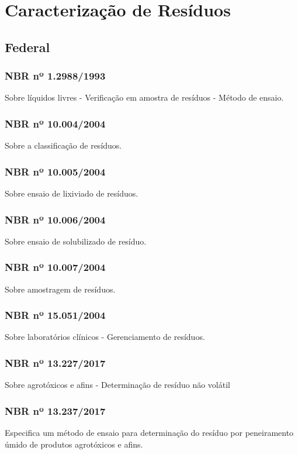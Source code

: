 \section{Caracterização de Resíduos}

\begin{subapend}
	\subsection{Federal}
	\begin{subsubapend}
		\item \subsubsection{NBR nº 1.2988/1993}
		Sobre líquidos livres - Verificação em amostra de resíduos - Método de ensaio.
		\subsubsection{NBR nº 10.004/2004}
		Sobre a classificação de resíduos.
		\subsubsection{NBR nº 10.005/2004}
		Sobre ensaio de lixiviado de resíduos.
		\subsubsection{NBR nº 10.006/2004}
		Sobre ensaio de solubilizado de resíduo.
		\subsubsection{NBR nº 10.007/2004}
		Sobre amostragem de resíduos.
		\subsubsection{NBR nº 15.051/2004}
		Sobre laboratórios clínicos - Gerenciamento de resíduos.
		\subsubsection{NBR nº 13.227/2017}
		Sobre agrotóxicos e afins - Determinação de resíduo não volátil
		\subsubsection{NBR nº 13.237/2017}
		Especifica um método de ensaio para determinação do resíduo por peneiramento úmido de produtos agrotóxicos e afins.

\end{subsubapend}
\end{subapend}
